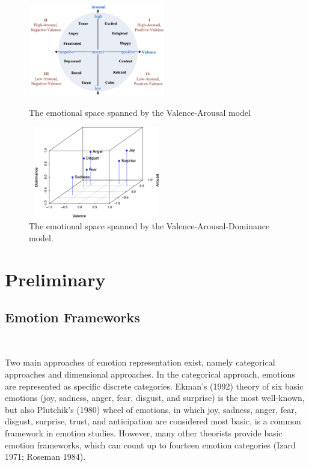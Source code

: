 \begin{figure}[htbp]
	\begin{minipage}[t]{0.5\linewidth}
		\centering
		\includegraphics[height=4cm,width=6cm]{figures/va_emotion.eps}
		\caption{The emotional space spanned by the Valence-Arousal model}\label{fig:va}
	\end{minipage}%
	\hfill
	\begin{minipage}[t]{0.5\linewidth}
		\centering
		\includegraphics[height=4cm,width=6cm]{figures/six_emotions_vad.eps}
		\caption{The emotional space spanned by the Valence-Arousal-Dominance model. }\label{fig:vad}
	\end{minipage}
\end{figure}


\section{Preliminary}

\subsection{Emotion Frameworks}
\

Two main approaches of emotion representation exist, 
namely categorical approaches and dimensional approaches.
In the categorical approach, 
emotions are represented as specific discrete categories.
 Ekman’s (1992) theory of six basic emotions 
 (joy, sadness, anger, fear, disgust, and surprise) 
 is the most well-known, 
 but also Plutchik’s (1980) wheel of emotions, 
 in which joy, sadness, anger, fear, disgust, surprise, trust, 
 and anticipation are considered most basic,
is a common framework in emotion studies. 
However, 
many other theorists provide basic emotion frameworks, 
which can count up to fourteen emotion categories 
(Izard 1971; Roseman 1984).

